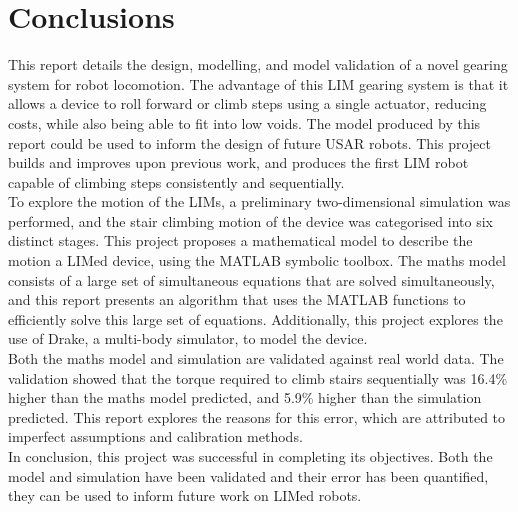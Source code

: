 \chapter{Conclusions}

This report details the design, modelling, and model validation of a novel gearing system for robot locomotion. The advantage of this LIM gearing system is that it allows a device to roll forward or climb steps using a single actuator, reducing costs, while also being able to fit into low voids. The model produced by this report could be used to inform the design of future USAR robots. This project builds and improves upon previous work, and produces the first LIM robot capable of climbing steps consistently and sequentially. \\

To explore the motion of the LIMs, a preliminary two-dimensional simulation was performed, and the stair climbing motion of the device was categorised into six distinct stages. This project proposes a mathematical model to describe the motion a LIMed device, using the MATLAB symbolic toolbox. The maths model consists of a large set of simultaneous equations that are solved simultaneously, and this report presents an algorithm that uses the MATLAB functions to efficiently solve this large set of equations. Additionally, this project explores the use of Drake, a multi-body simulator, to model the device. \\

Both the maths model and simulation are validated against real world data. The validation showed that the torque required to climb stairs sequentially was 16.4\% higher than the maths model predicted, and 5.9\% higher than the simulation predicted. This report explores the reasons for this error, which are attributed to imperfect assumptions and calibration methods.\\

In conclusion, this project was successful in completing its objectives. Both the model and simulation have been validated and their error has been quantified, they can be used to inform future work on LIMed robots.